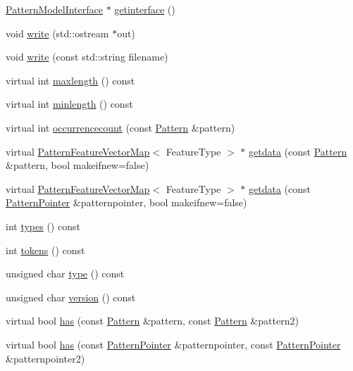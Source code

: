 \begin{DoxyCompactItemize}
\item 
\hyperlink{classPatternModelInterface}{Pattern\+Model\+Interface} $\ast$ \hyperlink{classPatternAlignmentModel_aa3589420a199d86a117ca661ab4d5694}{getinterface} ()
\item 
void \hyperlink{classPatternAlignmentModel_a335c3f85686db801fafeb328bf8df5e8}{write} (std\+::ostream $\ast$out)
\item 
void \hyperlink{classPatternAlignmentModel_a9648856710033da53fa87f7fd52ddab1}{write} (const std\+::string filename)
\item 
virtual int \hyperlink{classPatternAlignmentModel_a304de9330665edddeadd418368165a4f}{maxlength} () const 
\item 
virtual int \hyperlink{classPatternAlignmentModel_a5ce5600308b9c985d4197853ec4f35a7}{minlength} () const 
\item 
virtual int \hyperlink{classPatternAlignmentModel_a98266fb6a4b062d35275737f34139440}{occurrencecount} (const \hyperlink{classPattern}{Pattern} \&pattern)
\item 
virtual \hyperlink{classPatternFeatureVectorMap}{Pattern\+Feature\+Vector\+Map}$<$ Feature\+Type $>$ $\ast$ \hyperlink{classPatternAlignmentModel_a320018e7e852d6428db5368a0c076a2d}{getdata} (const \hyperlink{classPattern}{Pattern} \&pattern, bool makeifnew=false)
\item 
virtual \hyperlink{classPatternFeatureVectorMap}{Pattern\+Feature\+Vector\+Map}$<$ Feature\+Type $>$ $\ast$ \hyperlink{classPatternAlignmentModel_a5f14f98332c38a211d12a9eddbc056da}{getdata} (const \hyperlink{classPatternPointer}{Pattern\+Pointer} \&patternpointer, bool makeifnew=false)
\item 
int \hyperlink{classPatternAlignmentModel_a4b7cea0a70074db5314d47b3768633cc}{types} () const 
\item 
int \hyperlink{classPatternAlignmentModel_a44a222ef3c195ac3eff61ae35bf84d77}{tokens} () const 
\item 
unsigned char \hyperlink{classPatternAlignmentModel_a4261323744204ec80057bb56ce34ffc1}{type} () const 
\item 
unsigned char \hyperlink{classPatternAlignmentModel_a7ca0fbfb5669d6fbfd7b24d11092074b}{version} () const 
\item 
virtual bool \hyperlink{classPatternAlignmentModel_a2617a747d23df9dfd0fd66aba9cbea6b}{has} (const \hyperlink{classPattern}{Pattern} \&pattern, const \hyperlink{classPattern}{Pattern} \&pattern2)
\item 
virtual bool \hyperlink{classPatternAlignmentModel_acfec49f2317d9dd12aebe630b6caa413}{has} (const \hyperlink{classPatternPointer}{Pattern\+Pointer} \&patternpointer, const \hyperlink{classPatternPointer}{Pattern\+Pointer} \&patternpointer2)

\end{DoxyCompactItemize}
